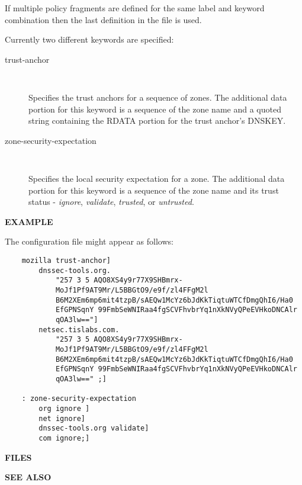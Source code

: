 \begin{description}
If multiple policy fragments are defined for the same label and keyword
combination then the last definition in the file is used.

Currently two different keywords are specified:

\begin{description}

\item [trust-anchor]\verb" "

Specifies the trust anchors for a sequence of zones.  The additional
data portion for this keyword is a sequence of the zone name and a 
quoted string containing the RDATA portion for the trust anchor's 
DNSKEY.

\item [zone-security-expectation]\verb" "

Specifies the local security expectation for a zone.  The additional
data portion for this keyword is a sequence of the zone name and 
its trust status - {\it ignore}, {\it validate}, {\it trusted}, or
{\it untrusted}.

\end{description}
\end{description}

{\bf EXAMPLE}

The  configuration file might appear as follows:

\begin{verbatim}
    mozilla trust-anchor]
        dnssec-tools.org.
            "257 3 5 AQO8XS4y9r77X9SHBmrx-
            MoJf1Pf9AT9Mr/L5BBGtO9/e9f/zl4FFgM2l
            B6M2XEm6mp6mit4tzpB/sAEQw1McYz6bJdKkTiqtuWTCfDmgQhI6/Ha0
            EfGPNSqnY 99FmbSeWNIRaa4fgSCVFhvbrYq1nXkNVyQPeEVHkoDNCAlr
            qOA3lw=="]
        netsec.tislabs.com.
            "257 3 5 AQO8XS4y9r77X9SHBmrx-
            MoJf1Pf9AT9Mr/L5BBGtO9/e9f/zl4FFgM2l
            B6M2XEm6mp6mit4tzpB/sAEQw1McYz6bJdKkTiqtuWTCfDmgQhI6/Ha0
            EfGPNSqnY 99FmbSeWNIRaa4fgSCVFhvbrYq1nXkNVyQPeEVHkoDNCAlr
            qOA3lw==" ;]

    : zone-security-expectation
        org ignore ]
        net ignore]
        dnssec-tools.org validate]
        com ignore;]
\end{verbatim}

{\bf FILES}




{\bf SEE ALSO}

